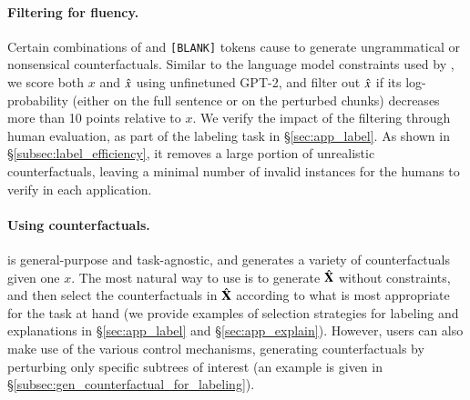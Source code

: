 \paragraph{Filtering for fluency.}
Certain combinations of \tagstrs and \texttt{[BLANK]} tokens cause \sysname to generate ungrammatical or nonsensical counterfactuals. 
Similar to the language model constraints used by \citet{morris2020textattack}, we score both $x$ and $\hat{x}$ using unfinetuned GPT-2, and filter out $\hat{x}$ if its log-probability (either on the full sentence or on the perturbed chunks) decreases more than 10 points relative to $x$.
We verify the impact of the filtering through human evaluation, as part of the labeling task in \S\ref{sec:app_label}.
As shown in \S\ref{subsec:label_efficiency}, it removes a large portion of unrealistic counterfactuals, leaving a minimal number of invalid instances for the humans to verify in each application.



\paragraph{Using counterfactuals.}
\sysname is general-purpose and task-agnostic, and generates a variety of counterfactuals given one $x$. The most natural way to use \sysname is to generate $\hat{\mathbf{X}}$ without constraints, and then select the counterfactuals in  $\hat{\mathbf{X}}$ according to what is most appropriate for the task at hand (we provide examples of selection strategies for labeling and explanations in \S\ref{sec:app_label} and \S\ref{sec:app_explain}). However, users can also make use of the various control mechanisms, \eg generating counterfactuals by perturbing only specific subtrees of interest (an example is given in \S\ref{subsec:gen_counterfactual_for_labeling}).






